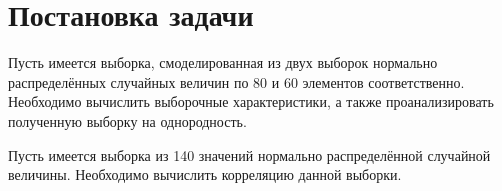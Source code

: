 \section{Постановка задачи}

Пусть имеется выборка, смоделированная из двух выборок нормально распределённых случайных величин по 80 и 60 элементов соответственно. Необходимо вычислить выборочные характеристики, а также проанализировать полученную выборку на однородность.

Пусть имеется выборка из 140 значений нормально распределённой случайной величины. Необходимо вычислить корреляцию данной выборки.



